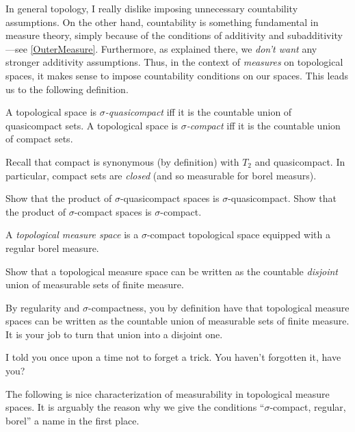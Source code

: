 In general topology, I really dislike imposing unnecessary countability assumptions.  On the other hand, countability is something fundamental in measure theory, simply because of the conditions of additivity and subadditivity---see \cref{OuterMeasure}.  Furthermore, as explained there, we \emph{don't want} any stronger additivity assumptions.  Thus, in the context of \emph{measures} on topological spaces, it makes sense to impose countability conditions on our spaces.  This leads us to the following definition.
\begin{dfn}\label{SigmaQuasicompact}
A topological space is \emph{$\sigma$-quasicompact} iff it is the countable union of quasicompact sets.  A topological space is \emph{$\sigma$-compact} iff it is the countable union of compact sets.
\begin{rmk}
Recall that compact is synonymous (by definition) with $T_2$ and quasicompact.  In particular, compact sets are \emph{closed} (and so measurable for borel measurs).
\end{rmk}
\end{dfn}
\begin{exr}\label{SigmaProductSigma}
Show that the product of $\sigma$-quasicompact spaces is $\sigma$-quasicompact.  Show that the product of $\sigma$-compact spaces is $\sigma$-compact.
\end{exr}
\begin{dfn}\label{TopologicalMeasureSpace}
A \emph{topological measure space} is a $\sigma$-compact topological space equipped with a regular borel measure.
\end{dfn}
\begin{exr}\label{SigmaFinite}
Show that a topological measure space can be written as the countable \emph{disjoint} union of measurable sets of finite measure.
\begin{rmk}
By regularity and $\sigma$-compactness, you by definition have that topological measure spaces can be written as the countable union of measurable sets of finite measure.  It is your job to turn that union into a disjoint one.
\end{rmk}
\begin{rmk}
I told you once upon a time not to forget a trick.  You haven't forgotten it, have you?
\end{rmk}
\end{exr}
The following is nice characterization of measurability in topological measure spaces.  It is arguably the reason why we give the conditions ``$\sigma$-compact, regular, borel'' a name in the first place.
